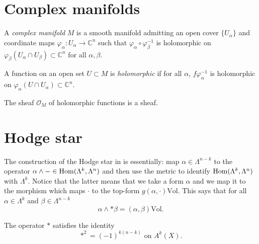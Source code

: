 \section{Complex manifolds}
\label{section-complex-manifolds}

\begin{definition}
\label{definition-complex-manifold}
A {\it complex manifold} $M$ is a smooth manifold admitting an open cover
$\{U_\alpha\}$ and coordinate maps $\varphi_\alpha:U_\alpha\to\mathbb{C}^n$ such
that $\varphi_\alpha\circ\varphi_\beta^{-1}$ is holomorphic on
$\varphi_\beta(U_\alpha\cap U_\beta)\subset\mathbb{C}^n$ for all $\alpha,\beta$.
\end{definition}

\begin{definition}
\label{definition-holomorphic-function-on-complex-manifold}
A function on an open set $U\subset M$ is {\it holomorphic} if for all $\alpha$,
$f\varphi_\alpha^{-1}$ is holomorphic on 
$\varphi_\alpha(U\cap U_\alpha)\subset\mathbb{C}^n$.
\end{definition}

\begin{lemma}
\label{lemma-holomorphic-function-sheaf}
The sheaf $\mathcal{O}_M$ of holomorphic functions is a sheaf.
\end{lemma}

\section{Hodge star}
\label{section-Hodge-star}

The construction of the Hodge star in  \cite[Section 5.1]{voi}
is essentially: map $\alpha \in \Lambda^{n-k}$ to the operator 
$\alpha \wedge - \in \mathop{\mathrm{Hom}}\nolimits(\Lambda^{k},\Lambda^n)$
and then use the metric to identify $\mathop{\mathrm{Hom}}\nolimits(\Lambda^k,\Lambda^n)$
with $\Lambda^k$. Notice that the latter
means that we take a form $\alpha$ and
we map it to the morphism
which maps $\cdot$ to the top-form 
$g(\alpha,\cdot)\text{Vol}$.
This says that for all $\alpha \in \Lambda^k$ 
and $\beta \in \Lambda^{n-k}$
\begin{equation}
\label{equation-Hodge-star}
\alpha\wedge*\beta=(\alpha,\beta)\text{Vol}.
\end{equation}

\begin{lemma}
\label{lemma-Hodge-star-squared}
\begin{reference}
\cite[Lemma 5.5]{voi}
\end{reference}
The operator $*$ satisfies the identity
\begin{equation}
\label{equation-Hodge-star-squared}
*^2=(-1)^{k(n-k)} \text{ on }A^k(X).
\end{equation}
\end{lemma}

